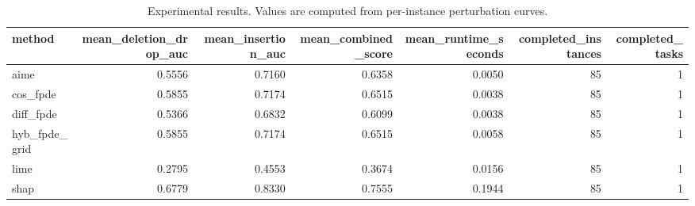 \begin{table}[t]
\caption{Experimental results. Values are computed from per-instance perturbation curves.}
\label{tab:main_results_computed}
\centering
\begin{tabular}{lrrrrrr}
\toprule
method & mean\_deletion\_drop\_auc & mean\_insertion\_auc & mean\_combined\_score & mean\_runtime\_seconds & completed\_instances & completed\_tasks \\
\midrule
aime & 0.5556 & 0.7160 & 0.6358 & 0.0050 & 85 & 1 \\
cos\_fpde & 0.5855 & 0.7174 & 0.6515 & 0.0038 & 85 & 1 \\
diff\_fpde & 0.5366 & 0.6832 & 0.6099 & 0.0038 & 85 & 1 \\
hyb\_fpde\_grid & 0.5855 & 0.7174 & 0.6515 & 0.0058 & 85 & 1 \\
lime & 0.2795 & 0.4553 & 0.3674 & 0.0156 & 85 & 1 \\
shap & 0.6779 & 0.8330 & 0.7555 & 0.1944 & 85 & 1 \\
\bottomrule
\end{tabular}

\end{table}
